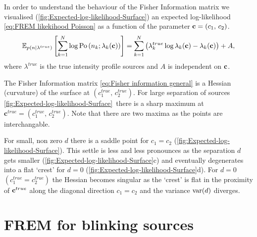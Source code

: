 In order to understand the behaviour of the Fisher Information matrix we visualised (\autoref{fig:Expected-log-likelihood-Surface}) an expected log-likelihood \autoref{eq:FREM likekihood Poisson} as a function of the parameter ${\bf c}=(c_1,\, c_2)$. 
%
\begin{equation}
	\mathbb{E}_{p(n|\lambda^{true})}\left[\sum_{k=1}^N\log\mathrm{Po}\left(n_k;\lambda_k({\bf c})\right)\right]=\sum_{k=1}^N\left(\lambda_k^{true}\log\lambda_k({\bf c})-\lambda_k({\bf c})\right)+A,
	\label{eq:Expected log-likelihood}
\end{equation}
%
where $\lambda^{true}$ is the true intensity profile sources and $A$ is independent on ${\bf c}$. 

The Fisher Information matrix \autoref{eq:Fisher information general} is a Hessian (curvature) of the surface at $(c_1^{true},\, c_2^{true})$. For large separation of sources \autoref{fig:Expected-log-likelihood-Surface}\aaa\ there is a sharp maximum at $\bm{c}^{true}=(c_1^{true},\, c_2^{true})$. Note that there are two maxima as the points are interchangable. 

For small, non zero $d$ there is a saddle point for $c_1=c_2$ (\autoref{fig:Expected-log-likelihood-Surface}\bbb). This settle is less and less pronounces as the separation $d$ gets smaller (\autoref{fig:Expected-log-likelihood-Surface}c) and eventually degenerates into a flat `crest' for $d=0$ (\autoref{fig:Expected-log-likelihood-Surface}d). For $d=0$ $(c_1^{true}=c_2^{true})$ the Hessian becomes singular as the `crest' is flat in the proximity of ${\bf c}^{true}$ along the diagonal direction $c_1=c_2$ and the variance $\mathrm{var}(d)$ diverges.


\section{FREM for blinking sources}

